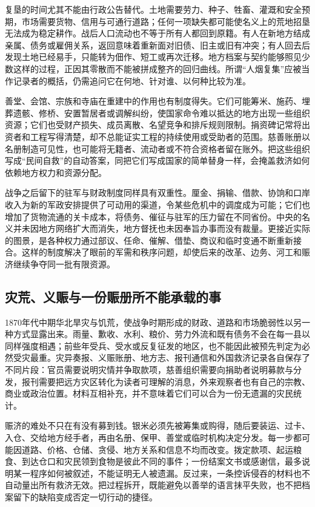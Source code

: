 复垦的时间尤其不能由行政公告替代。土地需要劳力、种子、牲畜、灌溉和安全预期，市场需要货物、信用与可通行道路；任何一项缺失都可能使名义上的荒地招垦无法成为稳定耕作。战后人口流动也不等于所有人都回到原籍。有人在新地方结成亲属、债务或雇佣关系，返回意味着重新面对旧债、旧主或旧有冲突；有人回去后发现土地已经易手，只能转为佃作、短工或再次迁移。地方档案与契约能够照见少数这样的过程，正因其零散而不能被拼成整齐的回归曲线。所谓“人烟复集”应被当作记录者的概括，仍需追问它在何地、针对谁、以何种比较为准。

善堂、会馆、宗族和寺庙在重建中的作用也有制度得失。它们可能筹米、施药、埋葬遗骸、修桥、安置暂居者或调解纠纷，使国家命令难以抵达的地方出现一些组织资源；它们也受财产损失、成员离散、名望竞争和排斥规则限制。捐资碑记常将出资者和工程写得清楚，却不总能证实工程的持续使用或受助者的范围。慈善账册以名册制造可见性，也可能将无籍者、流动者或不符合资格者留在账外。把这些组织写成“民间自救”的自动答案，同把它们写成国家的简单替身一样，会掩盖救济如何依赖地方权力和资源分配。

战争之后留下的驻军与财政制度同样具有双重性。厘金、捐输、借款、协饷和口岸收入为新的军政安排提供了可动用的渠道，令某些危机中的调度成为可能；它们也增加了货物流通的关卡成本，将债务、催征与驻军的压力留在不同省份。中央的名义并未因地方网络扩大而消失，地方督抚也未因奉旨办事而没有裁量。更接近实际的图景，是各种权力通过部议、任命、催解、借垫、商议和临时变通不断重新接合。这样的制度解决了眼前的军需和秩序问题，却使后来的改革、边务、河工和赈济继续争夺同一批有限资源。

\subsection{灾荒、义赈与一份赈册所不能承载的事}

1870年代中期华北旱灾与饥荒，使战争时期形成的财政、道路和市场脆弱性以另一种方式显露出来。雨量、歉收、水利、粮价、劳力外流和既有债务不会在每一县以同样强度相遇；前些年受兵、受水或反复征发的地区，也不能因此被预先判定为必然受灾最重。灾异奏报、义赈账册、地方志、报刊通信和外国救济记录各自保存了不同片段：官员需要说明灾情并争取款项，慈善组织需要向捐助者说明募款与分发，报刊需要把远方灾区转化为读者可理解的消息，外来观察者也有自己的宗教、商业或政治位置。材料互相补充，并不意味着它们可以合为一份无遗漏的灾民统计。

赈济的难处不只在有没有募到钱。银米必须先被筹集或购得，随后要装运、过卡、入仓、交给地方经手者，再由名册、保甲、善堂或临时机构决定分发。每一步都可能因道路、价格、仓储、贪侵、地方关系和信息不均而改变。拨定款项、起运粮食、到达仓口和灾民领到食物是彼此不同的事件；一份结案文书或感谢信，最多说明某一程序如何被叙述，不能证明无人被遗漏。反过来，一条控诉侵吞的材料也不自动量出所有救济无效。把过程拆开，既能避免以善举的语言抹平失败，也不把档案留下的缺陷变成否定一切行动的捷径。

